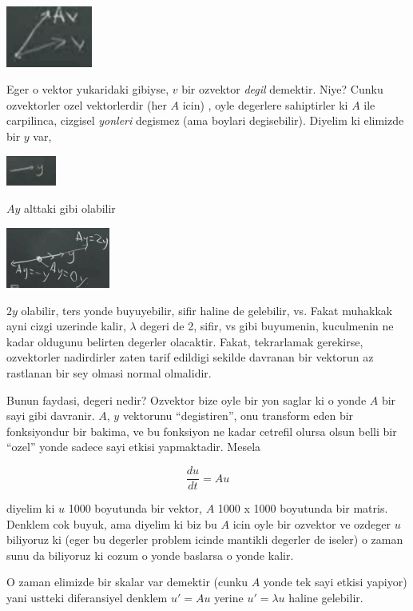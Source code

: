 \documentclass[12pt,fleqn]{article}
\begin{document}
\includegraphics[height=2cm]{5_2.png}

Eger o vektor yukaridaki gibiyse, $v$ bir ozvektor {\em degil}
demektir. Niye? Cunku ozvektorler ozel vektorlerdir (her $A$ icin) , oyle
degerlere sahiptirler ki $A$ ile carpilinca, cizgisel {\em yonleri}
degismez (ama boylari degisebilir). Diyelim ki elimizde bir $y$ var,

\includegraphics[height=1cm]{5_3.png}

$Ay$ alttaki gibi olabilir

\includegraphics[height=2cm]{5_4.png}

$2y$ olabilir, ters yonde buyuyebilir, sifir haline de gelebilir, vs. Fakat
muhakkak ayni cizgi uzerinde kalir, $\lambda$ degeri de 2, sifir, vs gibi
buyumenin, kuculmenin ne kadar oldugunu belirten degerler olacaktir. Fakat,
tekrarlamak gerekirse, ozvektorler nadirdirler zaten tarif edildigi sekilde
davranan bir vektorun az rastlanan bir sey olmasi normal olmalidir.

Bunun faydasi, degeri nedir? Ozvektor bize oyle bir yon saglar ki o yonde
$A$ bir sayi gibi davranir. $A$, $y$ vektorunu ``degistiren'', onu
transform eden bir fonksiyondur bir bakima, ve bu fonksiyon ne kadar
cetrefil olursa olsun belli bir ``ozel'' yonde sadece sayi etkisi
yapmaktadir. Mesela

\[ \frac{du}{dt} = Au \]

diyelim ki $u$ 1000 boyutunda bir vektor, $A$ 1000 x 1000 boyutunda bir
matris. Denklem cok buyuk, ama diyelim ki biz bu $A$ icin oyle bir ozvektor
ve ozdeger $u$ biliyoruz ki (eger bu degerler problem icinde mantikli
degerler de iseler) o zaman sunu da biliyoruz ki cozum o yonde baslarsa o
yonde kalir.

O zaman elimizde bir skalar var demektir (cunku $A$ yonde tek sayi etkisi
yapiyor) yani ustteki diferansiyel denklem $u' = Au$ yerine $u' = \lambda
u$ haline 
gelebilir.
\end{document}
